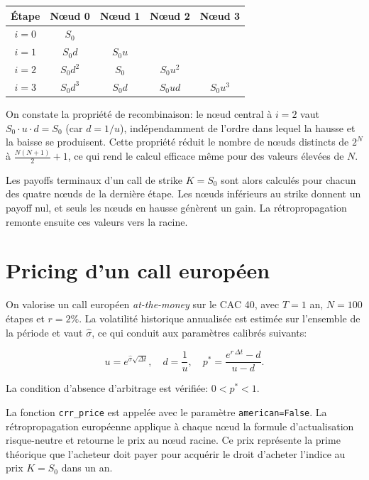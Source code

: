 \documentclass[11pt]{report}
\begin{document}
\begin{center}
\begin{tabular}{ccccc}
\toprule
Étape & Nœud 0 & Nœud 1 & Nœud 2 & Nœud 3 \\
\midrule
$i = 0$ & $S_0$      &           &           &            \\
$i = 1$ & $S_0 d$    & $S_0 u$   &           &            \\
$i = 2$ & $S_0 d^2$  & $S_0$     & $S_0 u^2$ &            \\
$i = 3$ & $S_0 d^3$  & $S_0 d$   & $S_0 u d$ & $S_0 u^3$  \\
\bottomrule
\end{tabular}
\end{center}

On constate la propriété de recombinaison: le nœud central à $i=2$ vaut $S_0 \cdot u \cdot d = S_0$ (car $d = 1/u$), indépendamment de l'ordre dans lequel la hausse et la baisse se produisent. Cette propriété réduit le nombre de nœuds distincts de $2^N$ à $\frac{N(N+1)}{2}+1$, ce qui rend le calcul efficace même pour des valeurs élevées de $N$.

Les payoffs terminaux d'un call de strike $K = S_0$ sont alors calculés pour chacun des quatre nœuds de la dernière étape. Les nœuds inférieurs au strike donnent un payoff nul, et seuls les nœuds en hausse génèrent un gain. La rétropropagation remonte ensuite ces valeurs vers la racine.

\section{Pricing d'un call européen}

On valorise un call européen \textit{at-the-money} sur le CAC 40, avec $T = 1$ an, $N = 100$ étapes et $r = 2\%$. La volatilité historique annualisée est estimée sur l'ensemble de la période et vaut $\hat{\sigma}$, ce qui conduit aux paramètres calibrés suivants:

\[
u = e^{\hat{\sigma}\sqrt{\Delta t}}, \quad
d = \frac{1}{u}, \quad
p^* = \frac{e^{r\,\Delta t} - d}{u - d}.
\]

La condition d'absence d'arbitrage est vérifiée: $0 < p^* < 1$.

La fonction \texttt{crr\_price} est appelée avec le paramètre \texttt{american=False}. La rétropropagation européenne applique à chaque nœud la formule d'actualisation risque-neutre et retourne le prix au nœud racine. Ce prix représente la prime théorique que l'acheteur doit payer pour acquérir le droit d'acheter l'indice au prix $K = S_0$ dans un an.
\end{document}
